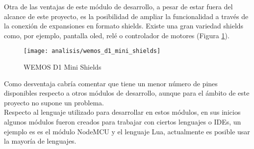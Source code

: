 \documentclass[../proyecto.tex]{subfiles}
\begin{document}
Otra de las ventajas de este módulo de desarrollo, a pesar de estar fuera del alcance de este proyecto, es la posibilidad de ampliar la funcionalidad a través de la conexión de expansiones en formato shields. Existe una gran variedad shields como, por ejemplo, pantalla oled, relé o controlador de motores (Figura \ref{fig:wemos_d1_mini_shields}).\\

\begin{figure}[h]
\centering
\texttt{[image: analisis/wemos\_d1\_mini\_shields]}
\caption{WEMOS D1 Mini Shields}
\label{fig:wemos_d1_mini_shields}
\end{figure}

Como desventaja cabría comentar que tiene un menor número de pines disponibles respecto a otros módulos de desarrollo, aunque para el ámbito de este proyecto no supone un problema.\\





Respecto al lenguaje utilizado para desarrollar en estos módulos, en sus inicios algunos módulos fueron creados para trabajar con ciertos lenguajes o IDEs, un ejemplo es es el módulo NodeMCU \cite{nodemcu_official_page} y el lenguaje Lua, actualmente es posible usar la mayoría de lenguajes.


\end{document}

